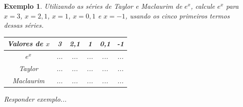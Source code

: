 \documentclass[12pt,a4paper]{book}
\newtheorem{example}{Exemplo}
\newcommand{\todo}[1]{
	{\color{red}#1}
}
\begin{document}
\begin{example}
    Utilizando as séries de Taylor e Maclaurim de $e^x$, calcule $e^x$ para $x=3$, $x=2,1$, $x=1$, $x=0,1$ e $x=-1$, usando os cinco primeiros termos dessas séries.

	\begin{center}
    	\begin{tabular}{|c|c|c|c|c|c|}
	    	\hline
        	Valores de $x$ & 3 & 2,1 & 1 & 0,1 & -1\\
    	    \hline
	        $e^x$ & {\color{red}...} & {\color{red}...} & {\color{red}...} & {\color{red}...} & {\color{red}...}\\
        	\hline
    	    Taylor & {\color{red}...} & {\color{red}...} & {\color{red}...} & {\color{red}...} & {\color{red}...}\\
        	\hline
	        Maclaurim & {\color{red}...} & {\color{red}...} & {\color{red}...} & {\color{red}...} & {\color{red}...}\\
    	    \hline
	    \end{tabular}
	\end{center}
	
	\todo{Responder exemplo...}
\end{example}
\end{document}
